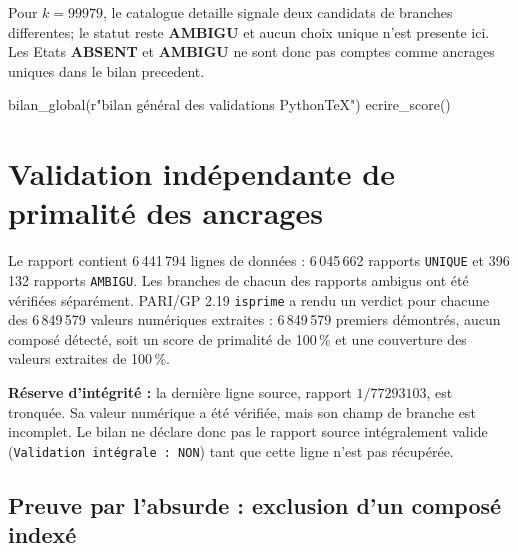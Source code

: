 \documentclass[11pt,a4paper]{article}
\begin{document}
Pour $k=99979$, le catalogue detaille signale deux candidats de branches differentes;
le statut reste \textbf{AMBIGU} et aucun choix unique n'est presente ici. Les Etats
\textbf{ABSENT} et \textbf{AMBIGU} ne sont donc pas comptes comme ancrages uniques dans
le bilan precedent.

\begin{pycode}
bilan_global(r"bilan général des validations PythonTeX")
ecrire_score()
\end{pycode}

\ifdefined\pytxok\else
{}
\fi

\clearpage
\section*{Validation indépendante de primalité des ancrages}

\begin{boiteformule}[Bilan de la reconstruction $k=28\,000\,000$ à $84\,000\,000$]
Le rapport contient 6\,441\,794 lignes de données : 6\,045\,662 rapports
\texttt{UNIQUE} et 396\,132 rapports \texttt{AMBIGU}. Les branches de chacun
des rapports ambigus ont été vérifiées séparément. PARI/GP 2.19
\texttt{isprime} a rendu un verdict pour chacune des 6\,849\,579 valeurs
numériques extraites : 6\,849\,579 premiers démontrés, aucun composé détecté,
soit un score de primalité de 100\,\% et une couverture des valeurs extraites
de 100\,\%.

\textbf{Réserve d'intégrité :} la dernière ligne source, rapport $1/77293103$,
est tronquée. Sa valeur numérique a été vérifiée, mais son champ de branche
est incomplet. Le bilan ne déclare donc pas le rapport source intégralement
valide (\texttt{Validation intégrale : NON}) tant que cette ligne n'est pas
récupérée.
\end{boiteformule}

\subsection*{Preuve par l'absurde : exclusion d'un composé indexé}
\end{document}
